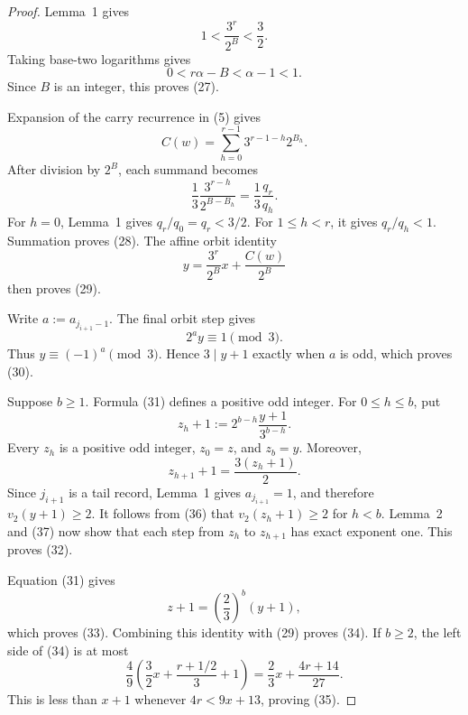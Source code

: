 \documentclass[11pt]{article}
\begin{document}
\begin{proof}
Lemma~1 gives
\[
  1<\frac{3^r}{2^B}<\frac32.
\]
Taking base-two logarithms gives
\[
  0<r\alpha-B<\alpha-1<1.
\]
Since $B$ is an integer, this proves (27).

Expansion of the carry recurrence in (5) gives
\[
  C(w)=\sum_{h=0}^{r-1}3^{r-1-h}2^{B_h}.
\]
After division by $2^B$, each summand becomes
\[
  \frac13\frac{3^{r-h}}{2^{B-B_h}}
  =\frac13\frac{q_r}{q_h}.
\]
For $h=0$, Lemma~1 gives $q_r/q_0=q_r<3/2$.  For
$1\leq h<r$, it gives $q_r/q_h<1$.  Summation proves (28).
The affine orbit identity
\[
  y=\frac{3^r}{2^B}x+\frac{C(w)}{2^B}
\]
then proves (29).

Write $a:=a_{j_{i+1}-1}$.  The final orbit step gives
\[
  2^a y\equiv1\pmod3.
\]
Thus $y\equiv(-1)^a\pmod3$.  Hence $3\mid y+1$ exactly when $a$ is odd,
which proves (30).

Suppose $b\geq1$.  Formula (31) defines a positive odd integer.  For
$0\leq h\leq b$, put
\[
  z_h+1:=2^{b-h}\frac{y+1}{3^{b-h}}.
  \tag{36}
\]
Every $z_h$ is a positive odd integer, $z_0=z$, and $z_b=y$.  Moreover,
\[
  z_{h+1}+1=\frac{3(z_h+1)}2.
  \tag{37}
\]
Since $j_{i+1}$ is a tail record, Lemma~1 gives
$a_{j_{i+1}}=1$, and therefore $v_2(y+1)\geq2$.  It follows from (36)
that $v_2(z_h+1)\geq2$ for $h<b$.  Lemma~2 and (37) now show that each
step from $z_h$ to $z_{h+1}$ has exact exponent one.  This proves (32).

Equation (31) gives
\[
  z+1=\left(\frac23\right)^b(y+1),
\]
which proves (33).  Combining this identity with (29) proves (34).  If
$b\geq2$, the left side of (34) is at most
\[
  \frac49
  \left(
    \frac32x+\frac{r+1/2}{3}+1
  \right)
  =
  \frac23x+\frac{4r+14}{27}.
\]
This is less than $x+1$ whenever $4r<9x+13$, proving (35).
\end{proof}
\end{document}
